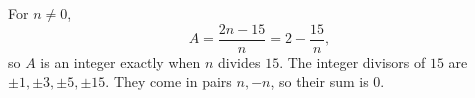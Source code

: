 For $n\ne0$,
\[
A=\dfrac{2n-15}{n}=2-\dfrac{15}{n},
\]
so $A$ is an integer exactly when $n$ divides $15$. The integer divisors of $15$ are $\pm1,\pm3,\pm5,\pm15$. They come in pairs $n,-n$, so their sum is $\boxed{0}$.
